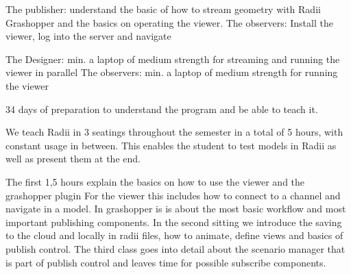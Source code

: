 \documentclass[letterpaper,10pt,english]{sphinxmanual}
\begin{document}
\sphinxAtStartPar
The publisher: understand the basic of how to stream geometry with Radii Grashopper and the basics on operating the viewer.
The observers: Install the viewer, log into the server and navigate

\sphinxAtStartPar
{}

\sphinxAtStartPar
The Designer: min. a laptop of medium strength for streaming and running the viewer in parallel
The observers:  min. a laptop of medium strength for running the viewer

\sphinxAtStartPar
{}

\sphinxAtStartPar
{} 3\sphinxhyphen{}4 days of preparation to understand the program and be able to teach it.

\sphinxAtStartPar
We teach Radii in 3 seatings throughout the semester in a total of 5 hours, with constant usage in between.
This enables the student to test models in Radii as well as present them at the end.

\sphinxAtStartPar
The first 1,5 hours explain the basics on how to use the viewer and the grashopper plugin
For the viewer this includes how to connect to a channel and navigate in a model. In grashopper
is is about the most basic workflow and most important publishing components.
In the second sitting we introduce the saving to the cloud and locally in radii files, how to animate, define views and basics of publish control.
The third class goes into detail about the scenario manager that is part of publish control and leaves time for possible subscribe components.
\end{document}
